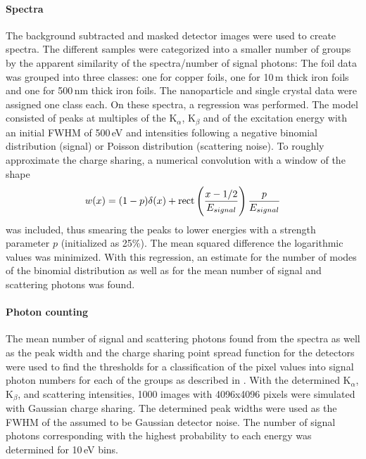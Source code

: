 \paragraph{Spectra}
The background subtracted and masked detector images were used to create spectra. The different samples were categorized into a smaller number of groups by the apparent similarity of the spectra/number of signal photons: The foil  data was grouped into three classes: one for copper foils, one for 10\,\textmu m thick iron foils and one for 500\,nm thick iron foils. The nanoparticle and single crystal data were assigned one class each.
On these spectra, a regression was performed.  The model consisted of peaks at multiples of the K$_\alpha$, K$_\beta$ and of the excitation energy with an initial FWHM of 500\,eV and intensities following a negative binomial distribution (signal) or Poisson distribution (scattering noise). To roughly approximate the charge sharing, a numerical convolution with a  window of the shape
\begin{equation}
	w (x)= (1-p)\delta(x)+\operatorname{rect}\left(\frac{x-1/2}{E_{signal}}\right)\frac{p}{E_{signal}}
\end{equation}
was included, thus smearing the peaks to lower energies with a strength parameter $p$ (initialized as 25\%). The mean squared difference the logarithmic values was minimized. With this regression, an estimate for the number of modes of the binomial distribution as well as for the mean number of signal and scattering photons was found.


\paragraph{Photon counting}
The mean number of signal and scattering photons found from the spectra as well as the peak width and the charge sharing point spread function for the detectors were used to find the thresholds for a classification of the pixel values into signal photon numbers for each of the groups as described in . 
With the determined K$_\alpha$, K$_\beta$, and scattering intensities, 1000 images with 4096x4096 pixels were simulated with Gaussian charge sharing. The determined peak widths were used as the FWHM of the assumed to be Gaussian detector noise.  The number of signal photons corresponding with the highest probability to each energy was determined for 10\,eV bins. 

